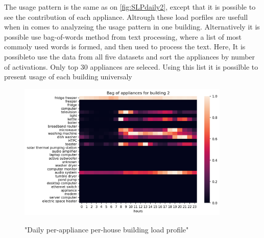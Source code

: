 The usage pattern is the same as on \ref{fig:SLPdaily2}, except that it is possible to see
the contribution of each appliance. 
Altrough these load porfiles are usefull when in comes to analyzeing the usage pattern in one building.
Alternatively it is possible use bag-of-words method from text processing, where a list of most commoly used words is formed,
and then used to process the text. 
Here, It is possibleto use the data from all five datasets and sort the appliances by number of activations.
Only top 30 appliances are seleced. 
Using this list it is possilble to present usage of each building universaly


\begin{figure}[H]
	\centering
	\caption{"Daily per-appliance per-house building load profile"}
	\includegraphics[width=0.9\textwidth]{../Figures/LPS/BOA.png}
	\label{fig:BOA}
\end{figure}


